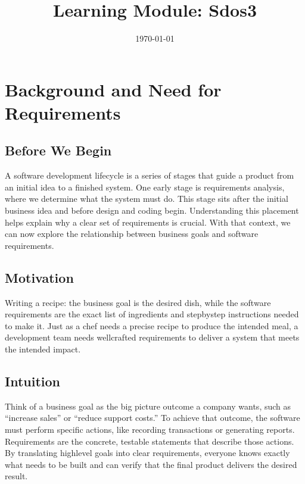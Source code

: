 \documentclass[12pt, a4paper]{article}
\title{Learning Module: Sdos3}
\author{}
\date{\today}
\begin{document}
\maketitle
\thispagestyle{empty}
\newpage

\tableofcontents
\newpage


\section{Background and Need for Requirements}
\subsection{Before We Begin}
A software development lifecycle is a series of stages that guide a product from an initial idea to a finished system. One early stage is requirements analysis, where we determine what the system must do. This stage sits after the initial business idea and before design and coding begin. Understanding this placement helps explain why a clear set of requirements is crucial. With that context, we can now explore the relationship between business goals and software requirements.

\subsection{Motivation}
Writing a recipe: the business goal is the desired dish, while the software requirements are the exact list of ingredients and stepbystep instructions needed to make it. Just as a chef needs a precise recipe to produce the intended meal, a development team needs wellcrafted requirements to deliver a system that meets the intended impact.

\subsection{Intuition}
Think of a business goal as the big picture outcome a company wants, such as ``increase sales'' or ``reduce support costs.'' To achieve that outcome, the software must perform specific actions, like recording transactions or generating reports. Requirements are the concrete, testable statements that describe those actions. By translating highlevel goals into clear requirements, everyone knows exactly what needs to be built and can verify that the final product delivers the desired result.
\end{document}
